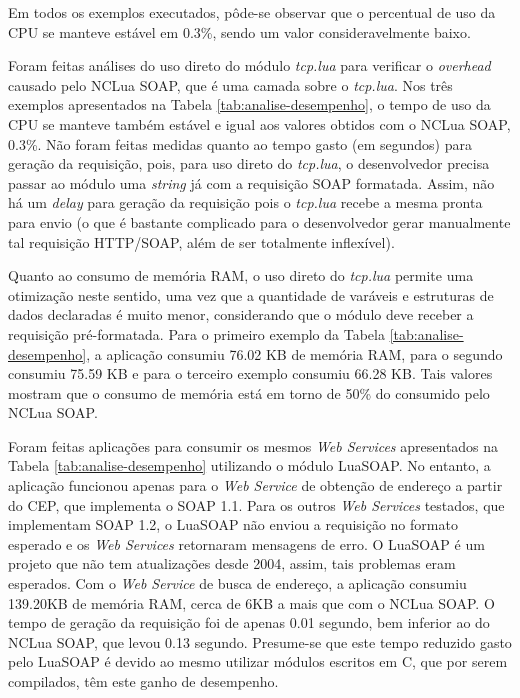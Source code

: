 Em todos os exemplos executados, pôde-se observar que o percentual de uso da CPU se 
manteve estável em 0.3\%, sendo um valor consideravelmente baixo.

Foram feitas análises do uso direto do módulo \textit{tcp.lua} para verificar o \textit{overhead}
causado pelo NCLua SOAP, que é uma camada sobre o \textit{tcp.lua}. Nos três exemplos
apresentados na Tabela \ref{tab:analise-desempenho}, o tempo de uso da CPU se manteve também estável e igual
aos valores obtidos com o NCLua SOAP, 0.3\%.
Não foram feitas medidas quanto ao tempo gasto (em segundos) para geração da requisição, pois,
para uso direto do \textit{tcp.lua}, o desenvolvedor precisa passar ao módulo uma \textit{string} já com a requisição
SOAP formatada. Assim, não há um \textit{delay} para geração da requisição pois o \textit{tcp.lua}
recebe a mesma pronta para envio (o que é bastante complicado para o desenvolvedor
gerar manualmente tal requisição HTTP/SOAP, além de ser totalmente inflexível).

Quanto ao consumo de memória RAM, o uso direto do \textit{tcp.lua} permite uma otimização
neste sentido, uma vez que a quantidade de varáveis e estruturas de dados
declaradas é muito menor, considerando que o módulo deve receber a requisição
pré-formatada. Para o primeiro exemplo da Tabela \ref{tab:analise-desempenho},
a aplicação consumiu 76.02 KB de memória RAM, para o segundo consumiu 75.59 KB 
e para o terceiro exemplo consumiu 66.28 KB. Tais valores mostram que o consumo
de memória está em torno de 50\% do consumido pelo NCLua SOAP.

Foram feitas aplicações para consumir os mesmos \textit{Web Services} apresentados
na Tabela \ref{tab:analise-desempenho} utilizando o módulo LuaSOAP. No entanto, 
a aplicação funcionou apenas para o \textit{Web Service} de obtenção de endereço
a partir do CEP, que implementa o SOAP 1.1. Para os outros \textit{Web Services} testados,
que implementam SOAP 1.2, o LuaSOAP não enviou a requisição no formato
esperado e os \textit{Web Services} retornaram mensagens de erro.
O LuaSOAP é um projeto que não tem atualizações desde 2004, assim,
tais problemas eram esperados.
Com o \textit{Web Service} de busca de endereço, a aplicação consumiu 
139.20KB de memória RAM, cerca de 6KB a mais que com o NCLua SOAP.
O tempo de geração da requisição foi de apenas 0.01 segundo, bem inferior
ao do NCLua SOAP, que levou 0.13 segundo. Presume-se que este tempo
reduzido gasto pelo LuaSOAP é devido ao mesmo utilizar módulos escritos 
em C, que por serem compilados, têm este ganho de desempenho.

